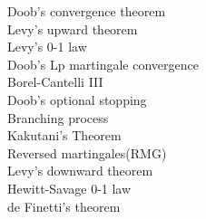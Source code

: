 \documentclass[paper=a4, fontsize=11pt]{scrartcl} %
\numberwithin{equation}{section} %
\numberwithin{figure}{section} %
\numberwithin{table}{section} %
\begin{document}
Doob's convergence theorem\\
Levy's upward theorem\\
Levy's 0-1 law\\
Doob's Lp martingale convergence\\
Borel-Cantelli III\\
Doob's optional stopping\\
Branching process\\
Kakutani's Theorem\\
Reversed martingales(RMG)\\
Levy's downward theorem\\
Hewitt-Savage 0-1 law\\
de Finetti's theorem
\end{document}
